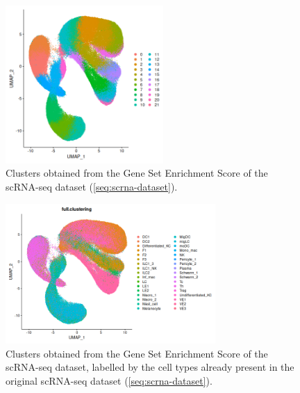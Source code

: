 \documentclass[aps,prb,twocolumn,superscriptaddress,floatfix,longbibliography]{revtex4-2}
\begin{document}
\begin{figure}[h]
\centering
\includegraphics[clip=true,width=6cm]{img/healthy-ES-clusters.png}
\caption{Clusters obtained from the Gene Set Enrichment Score of the scRNA-seq dataset (\ref{seq:scrna-dataset}).}
\label{fig:scrna-es-clusters}
\end{figure}

\begin{figure}[h]
\centering
\includegraphics[clip=true,width=8cm]{img/healthy-ES-cells.png}
\caption{Clusters obtained from the Gene Set Enrichment Score of the scRNA-seq dataset, labelled by the cell types already present in the original scRNA-seq dataset (\ref{seq:scrna-dataset}).}
\label{fig:scrna-es-cells}
\end{figure}
\end{document}
